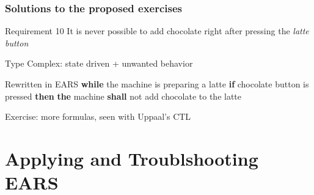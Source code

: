 \documentclass[aspectratio=169]{beamer}
\newcommand{\earsw}[3]{{\bf \color{mygreen}if} {#1} {\bf \color{mygreen}then} {\bf \color{mypurple}the} {#2} {\bf \color{mypurple}shall} {#3}}
\begin{document}
\begin{frame}
  \frametitle{Solutions to the proposed exercises}
  \begin{block}{Requirement 10}
    It is never possible to \alert{add chocolate} right after pressing the \emph{latte button}
  \end{block}
  \begin{block}{Type}
   Complex: state driven + unwanted behavior
  \end{block}
  \begin{block}{Rewritten in EARS}
   {\bf \color{mygreen} while} the machine is preparing a latte \earsw{chocolate button is pressed}{machine}{not add chocolate to the latte}
  \end{block}
\end{frame}


\begin{slide}{Exercise: more formulas, seen with Uppaal's CTL}
\end{slide}

\section*{Applying and Troublshooting EARS}
\end{document}

